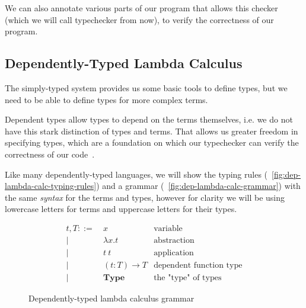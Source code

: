\documentclass[12pt]{article}
\theoremstyle{definition}
\newcommand{\fnarrow}{\rightarrow}
\newcommand{\tylit}{\textbf{Type}}
\begin{document}
We can also annotate various parts of our program that allows this checker (which we will call typechecker from now), to verify the correctness of our program.

\subsection{Dependently-Typed Lambda Calculus}\label{dep-types}

The simply-typed system provides us some basic tools to define types, but we need to be able to define types for more complex terms.

Dependent types allow types to depend on the terms themselves, i.e. we do not have this stark distinction of types and terms. That allows us greater freedom in specifying types, which are a foundation on which our typechecker can verify the correctness of our code~\cite{advancedtapl}.

Like many dependently-typed languages, we will show the typing rules (~\autoref{fig:dep-lambda-calc-typing-rules}) and a grammar (~\autoref{fig:dep-lambda-calc-grammar}) with the same \emph{syntax} for the terms and types, however for clarity we will be using lowercase letters for terms and uppercase letters for their types.

\begin{figure}[H]
       \[
              \begin{aligned}
                     t, T ::= & \ x                  & \text{variable}                \\
                     |        & \  \lambda x.t       & \text{abstraction}             \\
                     |        & \  t\ t              & \text{application}             \\
                     |        & \ (t : T) \fnarrow T & \text{dependent function type} \\
                     |        & \ \tylit             & \text{the "type" of types}
              \end{aligned}
       \]
       \caption{Dependently-typed lambda calculus grammar}
       \label{fig:dep-lambda-calc-grammar}
\end{figure}
\end{document}
